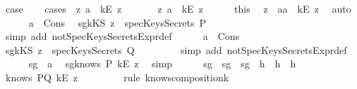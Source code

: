 \begin{isabellebody}
\ {\isacharquery}case\isanewline
\ \ \isamarkupfalse%
\ {\isacharparenleft}cases\ {\isachardoublequoteopen}{\isasymexists}\ z{}{\isachardot}\ a\ {\isacharequal}\ kE\ z{}{\isachardoublequoteclose}{\isacharparenright}\isanewline
\ \ \ \ \isamarkupfalse%
\ {\isachardoublequoteopen}{\isasymexists}\ z{}{\isachardot}\ a\ {\isacharequal}\ {\isacharparenleft}kE\ z{}{\isacharparenright}{\isachardoublequoteclose}\isanewline
\ \ \ \ \isamarkupfalse%
\ this\ \isamarkupfalse%
\ z\ \ a{}{\isacharcolon}{\isachardoublequoteopen}a\ {\isacharequal}\ {\isacharparenleft}kE\ z{\isacharparenright}{\isachardoublequoteclose}\ \isamarkupfalse%
\ auto\isanewline
\ \ \ \ \isamarkupfalse%
\ a{}\ \ Cons\ \isamarkupfalse%
\ sg{}{\isacharcolon}{\isachardoublequoteopen}{\isacharparenleft}kKS\ z{\isacharparenright}\ {\isasymnotin}\ specKeysSecrets\ P{\isachardoublequoteclose}\isanewline
\ \ \ \ \ \ \isamarkupfalse%
\ {\isacharparenleft}simp\ add{\isacharcolon}\ notSpecKeysSecretsExpr{\isacharunderscore}def{\isacharparenright}\isanewline
\ \ \ \ \isamarkupfalse%
\ a{}\ \ Cons\ \isamarkupfalse%
\ sg{}{\isacharcolon}{\isachardoublequoteopen}{\isacharparenleft}kKS\ z{\isacharparenright}\ {\isasymnotin}\ specKeysSecrets\ Q{\isachardoublequoteclose}\ \isanewline
\ \ \ \ \ \ \isamarkupfalse%
\ {\isacharparenleft}simp\ add{\isacharcolon}\ notSpecKeysSecretsExpr{\isacharunderscore}def{\isacharparenright}\isanewline
\ \ \ \ \isamarkupfalse%
\ sg{}\ \ a{}\ \isamarkupfalse%
\ sg{}{\isacharcolon}{\isachardoublequoteopen}knows\ P\ {\isacharbrackleft}kE\ z{\isacharbrackright}{\isachardoublequoteclose}\ \isamarkupfalse%
\ simp\isanewline
\ \ \ \ \isamarkupfalse%
\ sg{}\ \ sg{}\ \ sg{}\ \ h{}\ \ h{}\ \ h{}\ \ \isanewline
\ \ \ \ \ \ \isamarkupfalse%
\ {\isachardoublequoteopen}knows\ PQ\ {\isacharbrackleft}kE\ z{\isacharbrackright}{\isachardoublequoteclose}\ \isanewline
\ \ \ \ \ \ \isamarkupfalse%
\ {\isacharparenleft}rule\ knows{\isacharunderscore}composition{}{\isacharunderscore}k{\isacharparenright}\isanewline

\end{isabellebody}
